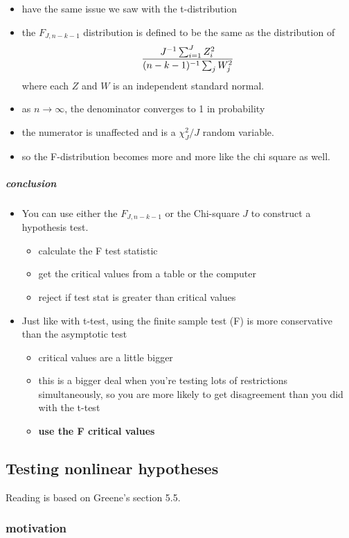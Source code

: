 \documentclass[11pt]{article}
\begin{document}
\begin{itemize}
\item have the same issue we saw with the t-distribution
\item the $F_{J, n-k-1}$ distribution is defined to be the same as
          the distribution of
          \[{J^{-1} \sum_{i=1}^J Z_i^2 \over (n-k-1)^{-1} \sum_j
          W_j^2}\] where each $Z$ and $W$ is an independent standard normal.
\item as $n\to \infty$, the denominator converges to 1 in probability
\item the numerator is unaffected and is a $\chi^2_J / J$ random variable.
\item so the F-distribution becomes more and more like the chi
          square as well.
\end{itemize}
\subparagraph{conclusion}
\label{sec-3-1-2-3-2}

\begin{itemize}
\item You can use either the $F_{J, n-k-1}$ or the Chi-square $J$ to
          construct a hypothesis test.
\begin{itemize}
\item calculate the F test statistic
\item get the critical values from a table or the computer
\item reject if test stat is greater than critical values
\end{itemize}
\item Just like with t-test, using the finite sample test (F) is
          more conservative than the asymptotic test
\begin{itemize}
\item critical values are a little bigger
\item this is a bigger deal when you're testing lots of
            restrictions simultaneously, so you are more likely to get
            disagreement than you did with the t-test
\item \textbf{use the F critical values}
\end{itemize}
\end{itemize}
\subsection{Testing nonlinear hypotheses}
\label{sec-3-2}

     Reading is based on Greene's section 5.5.
\subsubsection{motivation}
\label{sec-3-2-1}
\end{document}
